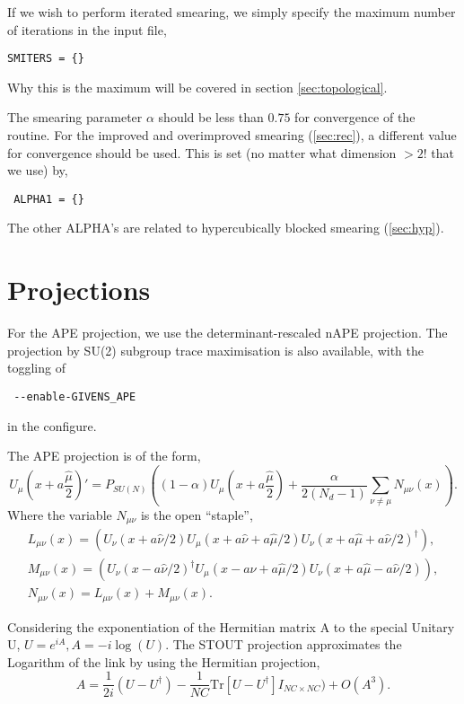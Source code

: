 \documentclass[12pt]{article}
\newcommand{\UMP}{\mbox{$U_\mu\left(x+a\frac{\hat\mu}{2}\right)$}}
\begin{document}
If we wish to perform iterated smearing, we simply specify the maximum number of iterations in the input file,
\begin{verbatim}
SMITERS = {}
\end{verbatim}
Why this is the maximum will be covered in section \ref{sec:topological}.

The smearing parameter $\alpha$ should be less than $0.75$ for convergence of the routine. For the improved and overimproved smearing (\ref{sec:rec}), a different value for convergence should be used. This is set (no matter what dimension $>2!$ that we use) by,
\begin{verbatim}
 ALPHA1 = {}
\end{verbatim}
The other ALPHA's are related to hypercubically blocked smearing (\ref{sec:hyp}).

\section{Projections}

For the APE projection, we use the determinant-rescaled nAPE projection. The projection by SU(2) subgroup trace maximisation is also available, with the toggling of
\begin{verbatim}
 --enable-GIVENS_APE
\end{verbatim}
in the configure.

The APE projection is of the form,
\begin{equation}
\UMP' = P_{SU(N)}\left((1-\alpha)\UMP + \frac{\alpha}{2(N_d-1)} \sum_{\nu\neq\mu}N_{\mu\nu}(x)\right).
\end{equation}
Where the variable $N_{\mu\nu}$ is the open ``staple'',
\begin{equation}\begin{gathered}
L_{\mu\nu}(x) =
\left(U_\nu(x+a\hat{\nu}/2)U_\mu(x+a\hat{\nu}+a\hat{\mu}/2)U_\nu(x+a\hat{\mu}+a\hat{\nu}/2)^\dagger\right), \\
M_{\mu\nu}(x) =
\left(U_\nu(x-a\hat{\nu}/2)^{\dagger}U_\mu(x-a\hat{\nu}+a\hat{\mu}/2)U_\nu(x+a\hat{\mu}-a\hat{\nu}/2)\right), \\
N_{\mu\nu}(x) = L_{\mu\nu}(x) + M_{\mu\nu}(x).
\end{gathered}\end{equation}

Considering the exponentiation of the Hermitian matrix A to the special Unitary U, $U=e^{iA},A=-i\log(U)$. The STOUT projection approximates the Logarithm of the link by using the Hermitian projection,
\begin{equation}\label{eq:hermitian_approx}
A = \frac{1}{2i} (U-U^{\dagger} )- \frac{1}{NC}\text{Tr}[U-U^ { \dagger}]I_{NC\times NC})+O(A^3).
\end{equation}
\end{document}
